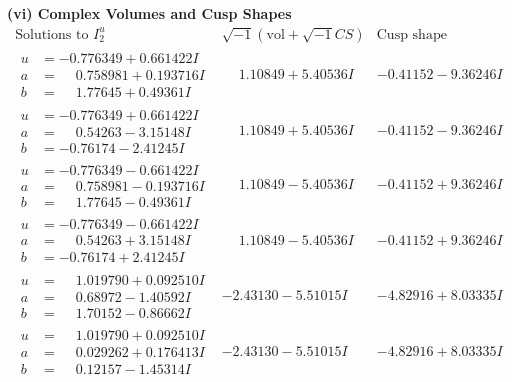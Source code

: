 \documentclass[1p]{elsarticle_modified}
\theoremstyle{definition}
\newcommand{\I}{\sqrt{-1}}
\begin{document}
\newpage\flushleft \textbf{(vi) Complex Volumes and Cusp Shapes}
$$\begin{array}{c|c|c}  
\text{Solutions to }I^u_{2}& \I (\text{vol} + \sqrt{-1}CS) & \text{Cusp shape}\\
 \hline 
\begin{aligned}
u &= -0.776349 + 0.661422 I \\
a &= \phantom{-}0.758981 + 0.193716 I \\
b &= \phantom{-}1.77645 + 0.49361 I\end{aligned}
 & \phantom{-}1.10849 + 5.40536 I & -0.41152 - 9.36246 I \\ \hline\begin{aligned}
u &= -0.776349 + 0.661422 I \\
a &= \phantom{-}0.54263 - 3.15148 I \\
b &= -0.76174 - 2.41245 I\end{aligned}
 & \phantom{-}1.10849 + 5.40536 I & -0.41152 - 9.36246 I \\ \hline\begin{aligned}
u &= -0.776349 - 0.661422 I \\
a &= \phantom{-}0.758981 - 0.193716 I \\
b &= \phantom{-}1.77645 - 0.49361 I\end{aligned}
 & \phantom{-}1.10849 - 5.40536 I & -0.41152 + 9.36246 I \\ \hline\begin{aligned}
u &= -0.776349 - 0.661422 I \\
a &= \phantom{-}0.54263 + 3.15148 I \\
b &= -0.76174 + 2.41245 I\end{aligned}
 & \phantom{-}1.10849 - 5.40536 I & -0.41152 + 9.36246 I \\ \hline\begin{aligned}
u &= \phantom{-}1.019790 + 0.092510 I \\
a &= \phantom{-}0.68972 - 1.40592 I \\
b &= \phantom{-}1.70152 - 0.86662 I\end{aligned}
 & -2.43130 - 5.51015 I & -4.82916 + 8.03335 I \\ \hline\begin{aligned}
u &= \phantom{-}1.019790 + 0.092510 I \\
a &= \phantom{-}0.029262 + 0.176413 I \\
b &= \phantom{-}0.12157 - 1.45314 I\end{aligned}
 & -2.43130 - 5.51015 I & -4.82916 + 8.03335 I \\ \hline\begin{aligned}

\end{aligned}
\end{array}$$
\end{document}
